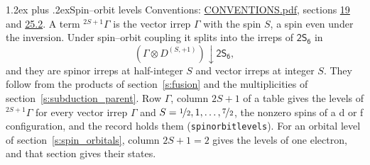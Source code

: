 \documentclass[10pt,a4paper]{article}
\makeatletter
\renewcommand\section{\@startsection{section}{1}{\z@}{-3ex plus -1ex minus -.2ex}%
  {1.2ex plus .2ex}{\normalfont\large\sffamily\bfseries\color{parttitle}}}
\numberwithin{equation}{section}
\newcommand{\grp}[1]{\mathsf{#1}}
\newcommand{\restr}[2]{#1\!\downarrow#2}
\newcommand{\irrJp}[2]{D^{(#1,#2)}}
\newcommand{\irrprod}{\otimes}
\newcommand{\term}[2]{{}^{#1}#2}
\makeatother
\begin{document}
\section{Spin--orbit levels}\label{s:spin_orbit}
Conventions: \href{../../CONVENTIONS.pdf}{CONVENTIONS.pdf}, sections \href{../../../rotation/CONVENTIONS.pdf\#conv.19}{19} and \href{../../CONVENTIONS.pdf\#conv.25.2}{25.2}.
\leavevmode\label{n:local.spin}\label{n:symbol.term}A term $\term{2S+1}{\Gamma}$ is the vector irrep $\Gamma$ with the spin $S$, a spin even under the inversion. Under spin--orbit coupling it splits into the irreps of $\grp{2S_{6}}$ in
\begin{equation}\label{e:spinorbit}\restr{(\Gamma \irrprod \irrJp{S}{+1})}{\grp{2S_{6}}},\end{equation}
and they are spinor irreps at half-integer $S$ and vector irreps at integer $S$. They follow from the products of section~\ref{s:fusion} and the multiplicities of section~\ref{s:subduction_parent}. Row $\Gamma$, column $2S + 1$ of a table gives the levels of $\term{2S+1}{\Gamma}$ for every vector irrep $\Gamma$ and $S = \nicefrac{1}{2}, 1, \dots, \nicefrac{7}{2}$, the nonzero spins of a d or f configuration, and the record holds them (\texttt{spinorbitlevels}). For an orbital level of section~\ref{s:spin_orbitals}, column $2S + 1 = 2$ gives the levels of one electron, and that section gives their states.
\end{document}
